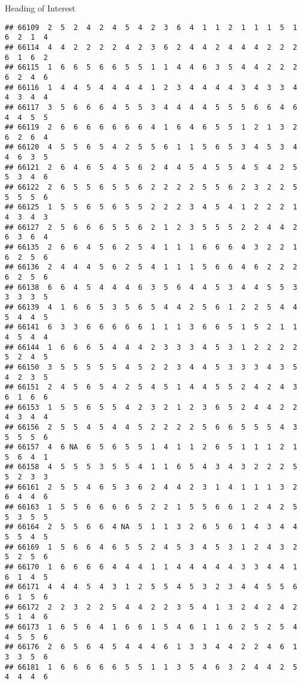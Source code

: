 \documentclass[
  ignorenonframetext,
]{beamer}
\begin{document}
\begin{frame}[fragile]{Heading of Interest}
\begin{verbatim}
## 66109  2  5  2  4  2  4  5  4  2  3  6  4  1  1  2  1  1  1  5  1  6  2  1  4
## 66114  4  4  2  2  2  2  4  2  3  6  2  4  4  2  4  4  4  2  2  2  6  1  6  2
## 66115  1  6  6  5  6  6  5  5  1  1  4  4  6  3  5  4  4  2  2  2  6  2  4  6
## 66116  1  4  4  5  4  4  4  4  1  2  3  4  4  4  4  3  4  3  3  4  4  3  4  4
## 66117  3  5  6  6  6  4  5  5  3  4  4  4  4  5  5  5  6  6  4  6  4  4  5  5
## 66119  2  6  6  6  6  6  6  6  4  1  6  4  6  5  5  1  2  1  3  2  6  2  6  4
## 66120  4  5  5  6  5  4  2  5  5  6  1  1  5  6  5  3  4  5  3  4  4  6  3  5
## 66121  2  6  4  6  5  4  5  6  2  4  4  5  4  5  5  4  5  4  2  5  5  3  4  6
## 66122  2  6  5  5  6  5  5  6  2  2  2  2  5  5  6  2  3  2  2  5  5  5  5  6
## 66125  1  5  5  6  5  6  5  5  2  2  2  3  4  5  4  1  2  2  2  1  4  3  4  3
## 66127  2  5  6  6  6  5  5  6  2  1  2  3  5  5  5  2  2  4  4  2  6  3  6  4
## 66135  2  6  6  4  5  6  2  5  4  1  1  1  6  6  6  4  3  2  2  1  6  2  5  6
## 66136  2  4  4  4  5  6  2  5  4  1  1  1  5  6  6  4  6  2  2  2  6  2  5  6
## 66138  6  6  4  5  4  4  4  6  3  5  6  4  4  5  3  4  4  5  5  3  3  3  3  5
## 66139  4  1  6  6  5  3  5  6  5  4  4  2  5  6  1  2  2  5  4  4  5  4  4  5
## 66141  6  3  3  6  6  6  6  6  1  1  1  3  6  6  5  1  5  2  1  1  4  5  4  4
## 66144  1  6  6  6  5  4  4  4  2  3  3  3  4  5  3  1  2  2  2  2  5  2  4  5
## 66150  3  5  5  5  5  5  4  5  2  2  3  4  4  5  3  3  3  4  3  5  4  2  3  5
## 66151  2  4  5  6  5  4  2  5  4  5  1  4  4  5  5  2  4  2  4  3  6  1  6  6
## 66153  1  5  5  6  5  5  4  2  3  2  1  2  3  6  5  2  4  4  2  2  4  3  4  4
## 66156  2  5  5  4  5  4  4  5  2  2  2  2  5  6  6  5  5  5  4  3  5  5  5  6
## 66157  4  6 NA  6  5  6  5  5  1  4  1  1  2  6  5  1  1  1  2  1  5  6  4  1
## 66158  4  5  5  5  3  5  5  4  1  1  6  5  4  3  4  3  2  2  2  5  5  2  3  3
## 66161  2  5  5  4  6  5  3  6  2  4  4  2  3  1  4  1  1  1  3  2  6  4  4  6
## 66163  1  5  5  6  6  6  6  5  2  2  1  5  5  6  6  1  2  4  2  5  5  3  5  5
## 66164  2  5  5  6  6  4 NA  5  1  1  3  2  6  5  6  1  4  3  4  4  5  5  4  5
## 66169  1  5  6  6  4  6  5  5  2  4  5  3  4  5  3  1  2  4  3  2  5  2  5  6
## 66170  1  6  6  6  6  4  4  4  1  1  4  4  4  4  4  3  3  4  4  1  6  1  4  5
## 66171  4  4  4  5  4  3  1  2  5  5  4  5  3  2  3  4  4  5  5  6  6  1  5  6
## 66172  2  2  3  2  2  5  4  4  2  2  3  5  4  1  3  2  4  2  4  2  5  1  4  6
## 66173  1  6  5  6  4  1  6  6  1  5  4  6  1  1  6  2  5  2  5  4  4  5  5  6
## 66176  2  6  5  6  4  5  4  4  4  6  1  3  3  4  4  2  2  4  6  1  3  3  5  6
## 66181  1  6  6  6  6  6  5  5  1  1  3  5  4  6  3  2  4  4  2  5  4  4  4  6

\end{verbatim}
\end{frame}
\end{document}
